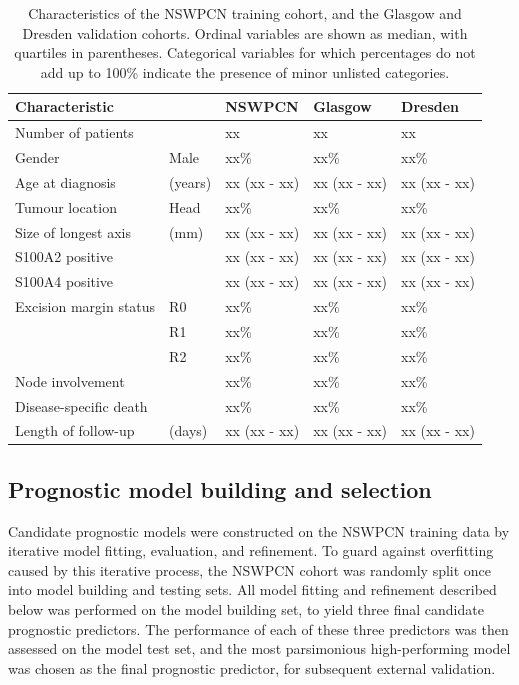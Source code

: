 \documentclass[dissertation.tex]{subfiles}
\begin{document}
\begin{table}[h]
\centering
\caption[Characteristics of patient cohorts]{Characteristics of the \gls{NSWPCN} training cohort, and the Glasgow and Dresden validation cohorts.  Ordinal variables are shown as median, with quartiles in parentheses.  Categorical variables for which percentages do not add up to 100\% indicate the presence of minor unlisted categories.}\label{tab:nomo-cohort-characteristics}
\begin{tabular}{@{}lllll@{}}
\toprule
Characteristic         &         & NSWPCN       & Glasgow      & Dresden      \\ \midrule
Number of patients     &         & xx           & xx           & xx           \\
Gender                 & Male    & xx\%         & xx\%         & xx\%         \\
Age at diagnosis       & (years) & xx (xx - xx) & xx (xx - xx) & xx (xx - xx) \\
Tumour location        & Head    & xx\%         & xx\%         & xx\%         \\
Size of longest axis   & (mm)    & xx (xx - xx) & xx (xx - xx) & xx (xx - xx) \\
S100A2 positive        &         & xx (xx - xx) & xx (xx - xx) & xx (xx - xx) \\
S100A4 positive        &         & xx (xx - xx) & xx (xx - xx) & xx (xx - xx) \\
Excision margin status & R0      & xx\%         & xx\%         & xx\%         \\
                       & R1      & xx\%         & xx\%         & xx\%         \\
                       & R2      & xx\%         & xx\%         & xx\%         \\
Node involvement       &         & xx\%         & xx\%         & xx\%         \\
Disease-specific death &         & xx\%         & xx\%         & xx\%         \\
Length of follow-up    & (days)  & xx (xx - xx) & xx (xx - xx) & xx (xx - xx) \\ \bottomrule
\end{tabular}
\end{table}

\subsection{Prognostic model building and selection}
Candidate prognostic models were constructed on the \gls{NSWPCN} training data by iterative model fitting, evaluation, and refinement.  To guard against overfitting caused by this iterative process, the \gls{NSWPCN} cohort was randomly split once into model building and testing sets.  All model fitting and refinement described below was performed on the model building set, to yield three final candidate prognostic predictors.  The performance of each of these three predictors was then assessed on the model test set, and the most parsimonious high-performing model was chosen as the final prognostic predictor, for subsequent external validation.
\end{document}

